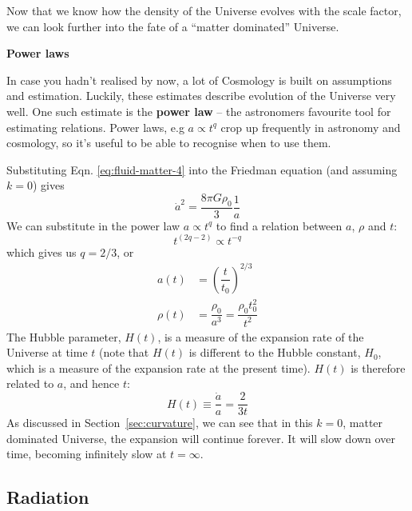 \documentclass[11pt,a4paper,notoc]{tufte-handout}
\begin{document}
Now that we know how the density of the Universe evolves with the scale
factor, we can look further into the fate of a ``matter dominated''
Universe.

\textbf{Power laws}

In case you hadn't realised by now, a lot of Cosmology is built on
assumptions and estimation. Luckily, these estimates describe evolution
of the Universe very well. One such estimate is the \textbf{power law} -- the
astronomers favourite tool for estimating relations. Power laws, e.g
\(a \propto t^q\) crop up frequently in astronomy and cosmology, so it's
useful to be able to recognise when to use them.

Substituting Eqn. \eqref{eq:fluid-matter-4} into the Friedman equation (and assuming \(k=0\))
gives
\begin{equation}
\dot{a}^2 = \dfrac{8\pi G \rho_0}{3}\dfrac{1}{a}
\label{eq:power-1}
\end{equation}
We can substitute in the power law \(a \propto t^q\) to find a relation between
\(a\), \(\rho\) and \(t\):
\begin{equation}
t^{(2q-2)} \propto t^{-q}
\label{eq:power-2}
\end{equation}
which gives us
\(q = 2/3\), or
\begin{align}
    a(t) &= \left(\dfrac{t}{t_0}\right)^{2/3}\\
    \rho(t) &= \dfrac{\rho_0}{a^3} = \dfrac{\rho_0 t_{0}^{2}}{t^2}
    \label{eq:power-3}
\end{align}
The Hubble parameter, \(H(t)\), is a measure of the expansion rate of the
Universe at time \(t\) (note that \(H(t)\) is different to the Hubble constant, \(H_0\), which is a measure of
the expansion rate at the present time). \(H(t)\) is therefore related to \(a\), and hence
\(t\):
\begin{equation}
H(t) \equiv \dfrac{\dot{a}}{a} = \dfrac{2}{3t}
\label{eq:power-4}
\end{equation}
As discussed in Section~\ref{sec:curvature}, we can see that in this \(k=0\), matter
dominated Universe, the expansion will continue forever. It will slow
down over time, becoming infinitely slow at \(t=\infty\).

\hypertarget{sec:radiation-eos}{%
\subsection{Radiation}\label{sec:radiation-eos}}
\end{document}
